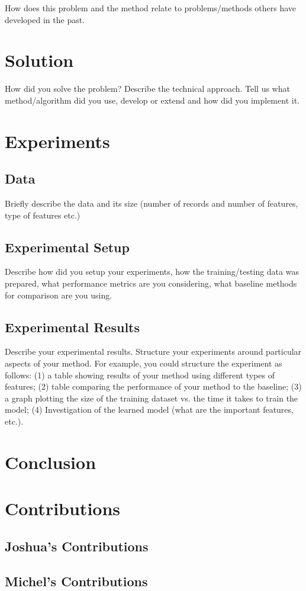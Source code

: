\documentclass[letterpaper,10pt]{article}
\begin{document}
  How does this problem and the method relate to problems/methods others
  have developed in the past.


  \section{Solution}

  How did you solve the problem? Describe the technical approach. Tell us
  what method/algorithm did you use, develop or extend and how did you
  implement it.


  \section{Experiments}

  \subsection{Data} Briefly describe the data and its size (number of
  records and number of features, type of features etc.)

  \subsection{Experimental Setup} Describe how did you setup your
  experiments, how the training/testing data was prepared, what performance
  metrics are you considering, what baseline methods for comparison are you
  using.

  \subsection{Experimental Results} Describe your experimental results.
  Structure your experiments around particular aspects of your method. For
  example, you could structure the experiment as follows: (1) a table
  showing results of your method using different types of features; (2)
  table comparing the performance of your method to the baseline; (3) a
  graph plotting the size of the training dataset vs. the time it takes to
  train the model; (4) Investigation of the learned model (what are the
  important features, etc.). \cite{santos2009}


  \section{Conclusion}


  \section{Contributions}

  \subsection{Joshua's Contributions}
  

  \subsection{Michel's Contributions}
  

  \clearpage
  
  
\end{document}
